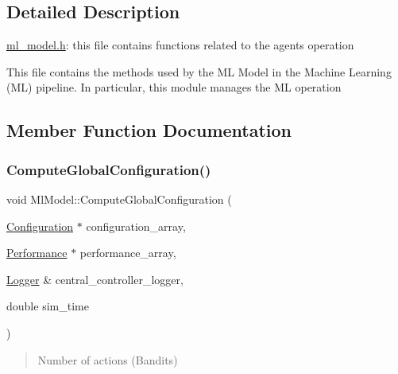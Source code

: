 \subsection{Detailed Description}
\hyperlink{ml__model_8h_source}{ml\+\_\+model.\+h}\+: this file contains functions related to the agents\textquotesingle{} operation


\begin{DoxyItemize}
\item This file contains the methods used by the ML Model in the Machine Learning (ML) pipeline. In particular, this module manages the ML operation 
\end{DoxyItemize}

\subsection{Member Function Documentation}
\mbox{\label{classMlModel_a97c9a74675555fd0d6e4442d555ce409}} 
\subsubsection{\texorpdfstring{Compute\+Global\+Configuration()}{ComputeGlobalConfiguration()}}
{\footnotesize\ttfamily void Ml\+Model\+::\+Compute\+Global\+Configuration (\begin{DoxyParamCaption}\item[{\hyperlink{structConfiguration}{Configuration} $\ast$}]{configuration\+\_\+array,  }\item[{\hyperlink{structPerformance}{Performance} $\ast$}]{performance\+\_\+array,  }\item[{\hyperlink{structLogger}{Logger} \&}]{central\+\_\+controller\+\_\+logger,  }\item[{double}]{sim\+\_\+time }\end{DoxyParamCaption})\hspace{0.3cm}{\ttfamily [inline]}}



\begin{quote}
Number of actions (Bandits) \end{quote}


